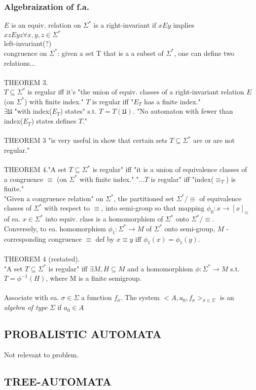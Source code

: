 \subsubsection{Algebraization of f.a.}
$E$ is an equiv. relation on $\Sigma^{*}$ is a right-invariant if $xEy$ implies $xzEyz \forall x, y, z \in \Sigma^{*}$\\
left-invariant(?)\\
congruence on $\Sigma^{*}$: given a set T that is a a subset of $\Sigma^{*}$, one can define two relations...\\
\\
THEOREM 3.\\
$T \subseteq \Sigma^{*}$ is regular iff it's "the union of equiv. classes of a right-invariant relation $E$ (on $\Sigma^{*}$) with finite index."  $T$ is regular iff "$E_{T}$ has a finite index."\\
$\exists \mathfrak{U}$ "with index($E_{T}$) states" s.t. $T = T(\mathfrak{U})$. "No automaton with fewer than index($E_{T}$) states defines $T$."\\
\\
THEOREM 3 "is very useful in show that certain sets $T \subseteq \Sigma^{*}$ are or are not regular."\\
\\
THEOREM 4."A set $T \subseteq \Sigma^{*}$ is regular" iff "it is a union of equivalence classes of a congruence $\equiv$ (on $\Sigma^{*}$ with finite index."  "...$T$ is regular" iff "index($\equiv_{T}$) is finite."\\
"Given a congruence relation" on $\Sigma^{*}$, the partitioned set $\Sigma^{*} / \equiv$ of equivalence classes of $\Sigma^{*}$ with respect to $\equiv$, into semi-group so that mapping $\phi_0 : x \to [x]_{\equiv}$  of ea. $x \in \Sigma^{*}$ into equiv. class is a homomorphism of $\Sigma^{*}$ onto $\Sigma^{*} / \equiv$.\\
Conversely, to ea. homomorphism $\phi_1 : \Sigma^{*} \to M$ of $\Sigma^{*}$ onto semi-group, $M$ - corresponding congruence $\equiv$ def by $x \equiv y$ iff $\phi_1 (x) = \phi_1 (y)$.\\
\\
THEOREM 4 (restated).\\
"A set $T \subseteq \Sigma^{*}$ is regular" iff $\exists M, H \subseteq M$ and a homomorphism $\phi : \Sigma^{*} \to M$ s.t. $T = \phi^{-1} (H)$, where M is a finite semigroup.\\
\\
Associate with ea. $\sigma \in \Sigma$ a function $f_{\sigma}$.  The system $<A, a_0, f_{\sigma}>_{\sigma \in \Sigma}$ is an \textit{algebra of type} $\Sigma$ if $a_0 \in A$

\subsection{PROBALISTIC AUTOMATA}
Not relevant to problem.

\subsection{TREE-AUTOMATA}